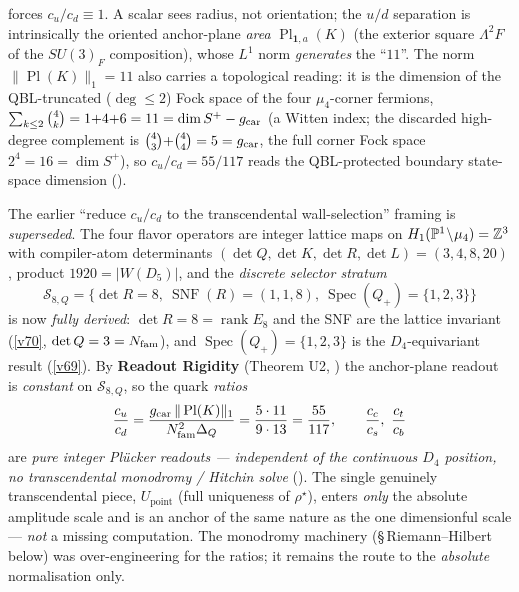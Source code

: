 \begin{keybox}
forces $c_u/c_d\equiv1$. A scalar sees radius, not orientation; the $u/d$ separation is intrinsically the
oriented anchor-plane \emph{area} $\operatorname{Pl}_{\mathbf1,a}(K)$ (the exterior square $\Lambda^2F$ of
the $SU(3)_F$ composition), whose $L^1$ norm \emph{generates} the ``$11$''. 
The norm $\|\operatorname{Pl}(K)\|_1=11$ also carries a topological reading: it is the dimension of the
QBL-truncated ($\deg\le2$) Fock space of the four $\mu_4$-corner fermions,
$\sum_{k\le2}\binom4k=1{+}4{+}6=11=\dim S^+-g_{\mathrm{car}}$ (a Witten index; the discarded high-degree complement is
$\binom43{+}\binom44=5=g_{\mathrm{car}}$, the full corner Fock space $2^4=16=\dim S^+$), so $c_u/c_d=55/117$ reads the
QBL-protected boundary state-space dimension ().
\end{keybox}

\begin{keybox}
The earlier ``reduce $c_u/c_d$ to the transcendental wall-selection'' framing is \emph{superseded}. The four
flavor operators are integer lattice maps on $H_1(\mathbb{P}^1\!\setminus\!\mu_4)=\mathbb{Z}^3$ with compiler-atom
determinants $(\det Q,\det K,\det R,\det L)=(3,4,8,20)$, product $1920=|W(D_5)|$, and the \emph{discrete
selector stratum}
\[
  \mathcal S_{8,Q}=\{\det R=8,\ \operatorname{SNF}(R)=(1,1,8),\ \operatorname{Spec}(Q_+)=\{1,2,3\}\}
\]
is now \emph{fully derived}: $\det R=8=\operatorname{rank}E_8$ and the SNF are the lattice invariant (\vref{v70},
$\det Q=3=N_{\mathrm{fam}}$), and $\operatorname{Spec}(Q_+)=\{1,2,3\}$ is the $D_4$-equivariant result (\vref{v69}). By
\textbf{Readout Rigidity} (Theorem U2, ) the anchor-plane readout is
\emph{constant} on $\mathcal S_{8,Q}$, so the quark \emph{ratios}
\[
  \frac{c_u}{c_d}=\frac{g_{\mathrm{car}}\,\|\operatorname{Pl}(K)\|_1}{N_{\mathrm{fam}}^2\Delta_Q}=\frac{5\cdot11}{9\cdot13}=\frac{55}{117},
  \qquad \frac{c_c}{c_s},\ \frac{c_t}{c_b}
\]
are \emph{pure integer Pl\"ucker readouts --- independent of the continuous $D_4$ position, no transcendental
monodromy / Hitchin solve} (). The single genuinely transcendental piece,
$U_{\mathrm{point}}$ (full uniqueness of $\rho^\star$), enters \emph{only} the absolute amplitude scale and is
an anchor of the same nature as the one dimensionful scale --- \emph{not} a missing computation. The monodromy
machinery (\S\,Riemann--Hilbert below) was over-engineering for the ratios; it remains the route to the
\emph{absolute} normalisation only.
\end{keybox}

